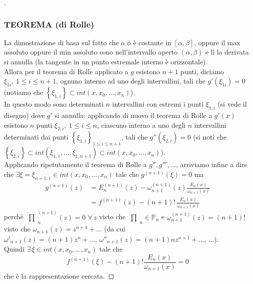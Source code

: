 \documentclass[12pt]{article}
\newcommand{\inter}{\begin{matrix}\prod\end{matrix}}
\begin{document}
\begin{proof}[\unskip\nopunct]
\subsubsection{TEOREMA (di Rolle)}
\begin{center}
\end{center}
La dimostrazione di basa sul fatto che o $\phi$ è costante in $[\alpha,\beta]$, oppure il max assoluto oppure il min assoluto sono nell'intervallo aperto $(\alpha,\beta)$ e lì la derivata si annulla (la tangente in un punto estremale interno è orizzontale). \\
Allora per il teorema di Rolle applicato a $g$ esistono $n+1$ punti, diciamo $\xi_{1i}, \ 1 \leq i \leq n+1$, ognuno interno ad uno degli intervallini, tali che $g'(\xi_{1i})=0$ (notiamo che $\left\{ \xi_{1,i} \right\} \subset int(x,x_0,\dots,x_n)$). \\
In questo modo sono determinati $n$ intervallini con estremi i punti $\xi_{1,i}$ (si vede il disegno) dove $g'$ si annulla: applicando di nuovo il teorema di Rolle a $g'(x)$ esistono $n$ punti $\xi_{2,i}, \ 1 \leq i \leq n$, ciascuno interno a uno degli $n$ intervallini determinati dai punti $\left\{ \xi_{1,i} \right\}_{1 \leq i \leq n+1}$, tali che $g''(\xi_{2,i}) = 0$ (si noti che $\left\{ \xi_{2,i} \right\} \subset int(\xi_{1,1},\dots, \xi_{1,n+1}) \subset int(x,x_0,\dots,x_n)$). \\
Applicando ripetutamente il teorema di Rolle a $g'',g''',\dotso$, arriviamo infine a dire che $\exists \xi = \xi_{n+1,1} \in int(x,x_0,\dots,x_n)$ tale che $g^{(n+1)}(\xi) = 0$ ma
\[\begin{split}
    g^{(n+1)}(z) & = E_n^{(n+1)}(z) - \omega_{n+1}^{(n+1)}(z) \frac{E_n(x)}{\omega_{n+1}(x)} \\
    & = f^{(n+1)}(z) - (n+1)!\, \frac{E_n(x)}{\omega_{n+1}(x)}
\end{split}\]
perchè $\inter_n^{(n+1)}(z) = 0 \,\,\forall\,z$ visto che $\inter_n \in \mathbb{P}_n$ e $\omega_{n+1}^{(n+1)}(z) = (n+1)!$ visto che $\omega_{n+1}(z) = z^{n+1} + \dotso$ (da cui $\omega'_{n+1}(z) = (n+1)z^n + \dotso,\, \omega''_{n+1}(z) = (n+1)nz^{n+1} + \dotso,\,\dotso$).\\
Quindi $\exists \, \xi \in int(x,x_0,\dotso,x_n)$ tale che
\[f^{(n+1)}(\xi) - (n+1)!\frac{E_n(x)}{\omega_{n+1}(x)} = 0\]
che è la rappresentazione cercata.
\end{proof}
\end{document}
